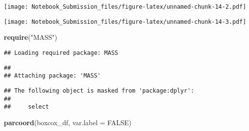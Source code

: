 \documentclass[
]{article}
\newenvironment{Shaded}{\begin{snugshade}}{\end{snugshade}}
\newcommand{\CommentTok}[1]{\textcolor[rgb]{0.56,0.35,0.01}{\textit{#1}}}
\newcommand{\DataTypeTok}[1]{\textcolor[rgb]{0.13,0.29,0.53}{#1}}
\newcommand{\DecValTok}[1]{\textcolor[rgb]{0.00,0.00,0.81}{#1}}
\newcommand{\KeywordTok}[1]{\textcolor[rgb]{0.13,0.29,0.53}{\textbf{#1}}}
\newcommand{\NormalTok}[1]{#1}
\newcommand{\OperatorTok}[1]{\textcolor[rgb]{0.81,0.36,0.00}{\textbf{#1}}}
\newcommand{\OtherTok}[1]{\textcolor[rgb]{0.56,0.35,0.01}{#1}}
\newcommand{\StringTok}[1]{\textcolor[rgb]{0.31,0.60,0.02}{#1}}
\begin{document}
\texttt{[image: Notebook\_Submission\_files/figure-latex/unnamed-chunk-14-2.pdf]}

\begin{Shaded}
\end{Shaded}

\texttt{[image: Notebook\_Submission\_files/figure-latex/unnamed-chunk-14-3.pdf]}

\begin{Shaded}
\begin{Highlighting}[]
\KeywordTok{require}\NormalTok{(}\StringTok{"MASS"}\NormalTok{)}
\end{Highlighting}
\end{Shaded}

\begin{verbatim}
## Loading required package: MASS
\end{verbatim}

\begin{verbatim}
## 
## Attaching package: 'MASS'
\end{verbatim}

\begin{verbatim}
## The following object is masked from 'package:dplyr':
## 
##     select
\end{verbatim}

\begin{Shaded}
\begin{Highlighting}[]
\KeywordTok{parcoord}\NormalTok{(boxcox_df, }\DataTypeTok{var.label =} \OtherTok{FALSE}\NormalTok{)}
\end{Highlighting}
\end{Shaded}
\end{document}
